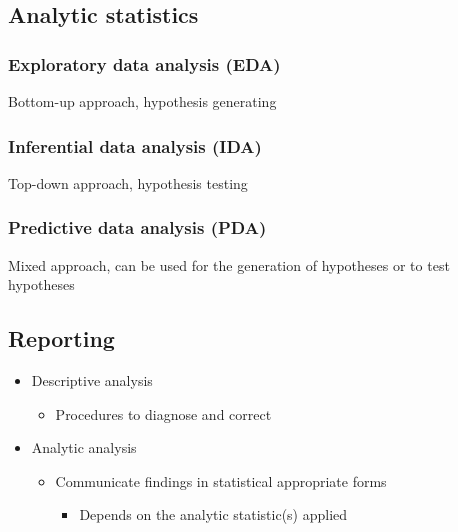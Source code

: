 \documentclass[
]{article}
\providecommand{\tightlist}{%
  \setlength{\itemsep}{0pt}\setlength{\parskip}{0pt}}
\begin{document}
\hypertarget{analytic-statistics}{%
\subsection{Analytic statistics}\label{analytic-statistics}}

\hypertarget{exploratory-data-analysis-eda}{%
\subsubsection{Exploratory data analysis (EDA)}\label{exploratory-data-analysis-eda}}

Bottom-up approach, hypothesis generating

\hypertarget{inferential-data-analysis-ida}{%
\subsubsection{Inferential data analysis (IDA)}\label{inferential-data-analysis-ida}}

Top-down approach, hypothesis testing

\hypertarget{predictive-data-analysis-pda}{%
\subsubsection{Predictive data analysis (PDA)}\label{predictive-data-analysis-pda}}

Mixed approach, can be used for the generation of hypotheses or to test hypotheses

\hypertarget{reporting}{%
\subsection{Reporting}\label{reporting}}

\begin{itemize}
\tightlist
\item
  Descriptive analysis

  \begin{itemize}
  \tightlist
  \item
    Procedures to diagnose and correct
  \end{itemize}
\item
  Analytic analysis

  \begin{itemize}
  \tightlist
  \item
    Communicate findings in statistical appropriate forms

    \begin{itemize}
    \tightlist
    \item
      Depends on the analytic statistic(s) applied
    \end{itemize}
  \end{itemize}
\end{itemize}
\end{document}
